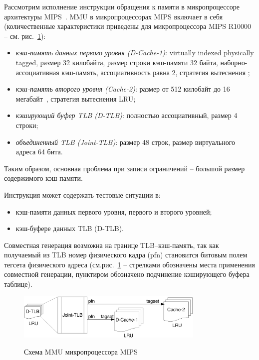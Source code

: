 Рассмотрим исполнение инструкции обращения к памяти в
микропроцессоре архитектуры MIPS~\cite{mips64_III}. MMU в
микропроцессорах MIPS включает в себя  (количественные
характеристики приведены для микропроцессора MIPS R10000 -- см.
рис.~\ref{mips_mmu_scheme}):
\begin{itemize}
  \item \emph{кэш-память данных первого уровня (D-Cache-1)}:  virtually
indexed physically tagged, размер 32 килобайта, размер строки
кэш-памяти 32 байта, наборно-ассоциативная кэш-память,
ассоциативность равна 2, стратегия вытеснения \LRU;
  \item \emph{кэш-память второго уровня (Cache-2)}: размер от 512 килобайт до 16
мегабайт~\cite{shnitman}, стратегия вытеснения LRU;
  \item \emph{кэширующий буфер TLB (D-TLB)}: полностью
  ассоциативный, размер 4 строки;
  \item \emph{объединенный TLB (Joint-TLB)}: размер 48 строк,
  размер виртуального адреса 64 бита.
\end{itemize}
Таким образом, основная проблема при записи ограничений -- большой
размер содержимого кэш-памяти.

Инструкция может содержать тестовые ситуации в:
\begin{itemize}
  \item кэш-памяти данных первого уровня, первого и второго уровней;
  \item кэш-буфере данных TLB (D-TLB).
\end{itemize}

Совместная генерация возможна на границе TLB--кэш-память, так как
получаемый из TLB номер физического кадра (pfn) становится битовым
полем тегсета физического адреса (см.рис.~\ref{mips_mmu_scheme} --
стрелками обозначены места применения совместной генерации,
пунктиром обозначено подчинение кэширующего буфера таблице).

\begin{figure}[h] \center
  \includegraphics[width=0.8\textwidth]{4.analysis/mips}\\
  \caption{Схема MMU микропроцессора MIPS}\label{mips_mmu_scheme}
\end{figure}

